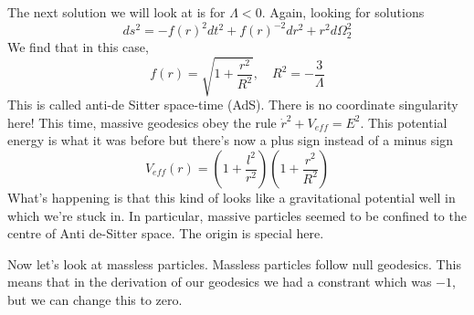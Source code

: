 The next solution we will look at is for 
$ \Lambda < 0 $. Again, looking for solutions 
\[
 ds^2 = - f ( r) ^ 2 dt ^ 2 + f ( r) ^{ - 2} dr ^ 2 + r ^ 2 d \Omega _ 2 ^ 2 
\] We find that in this case, 
\[
 f ( r) = \sqrt{ 1 + \frac{ r^ 2 }{ R ^ 2 } }  , \quad R ^ 2 = - \frac{ 3 }{ \Lambda}
\] This is called anti-de Sitter space-time (AdS). 
There is no coordinate singularity here! 
This time, massive geodesics obey the rule $ \dot{ r } ^ 2 + V_{ eff } = E ^ 2  $. 
This potential energy is what it was before but there's 
now a plus sign instead of a minus sign 
\[
	V_{ eff } ( r) = \left(  1 + \frac{l ^ 2 }{ r ^ 2 }   \right) \left(  
	1 + \frac{ r ^ 2 }{ R ^ 2 }\right) 
\] What's happening is that 
this kind of looks like a gravitational potential well in which we're stuck in. 
In particular, massive particles seemed to be confined to 
the centre of Anti de-Sitter space. The origin 
is special here.

Now let's look at massless particles. 
Massless particles follow null geodesics. This means 
that in the derivation of our geodesics we had a constrant 
which was $- 1 $, but we can change this to zero. 

